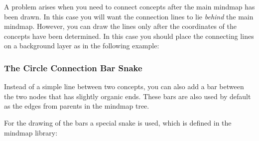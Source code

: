 A problem arises when you need to connect concepts after the main
mindmap has been drawn. In this case you will want the connection
lines to lie \emph{behind} the main mindmap. However, you can draw the
lines only after the coordinates of the concepts have been
determined. In this case you should place the connecting lines on a
background layer as in the following example:

\begin{codeexample}[]
\end{codeexample}


\subsubsection{The Circle Connection Bar Snake}

Instead of a simple line between two concepts, you can also add a bar
between the two nodes that has slightly organic ends. These bars are
also used by default as the edges from parents in the mindmap tree.

For the drawing of the bars a special snake is used, which is defined
in the mindmap library:

